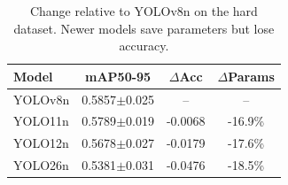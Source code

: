 \begin{table}[t]
\caption{Change relative to YOLOv8n on the hard dataset. Newer models save parameters but lose accuracy.}
\label{tab:relative}
\centering\footnotesize\renewcommand{\arraystretch}{1.3}
\begin{tabular}{@{}lccc@{}}
\toprule
\textbf{Model} & \textbf{mAP50-95} & \textbf{$\Delta$Acc} & \textbf{$\Delta$Params} \\
\midrule
YOLOv8n & 0.5857$\pm$0.025 & -- & -- \\
YOLO11n & 0.5789$\pm$0.019 & -0.0068 & -16.9\% \\
YOLO12n & 0.5678$\pm$0.027 & -0.0179 & -17.6\% \\
YOLO26n & 0.5381$\pm$0.031 & -0.0476 & -18.5\% \\
\bottomrule
\end{tabular}
\end{table}
